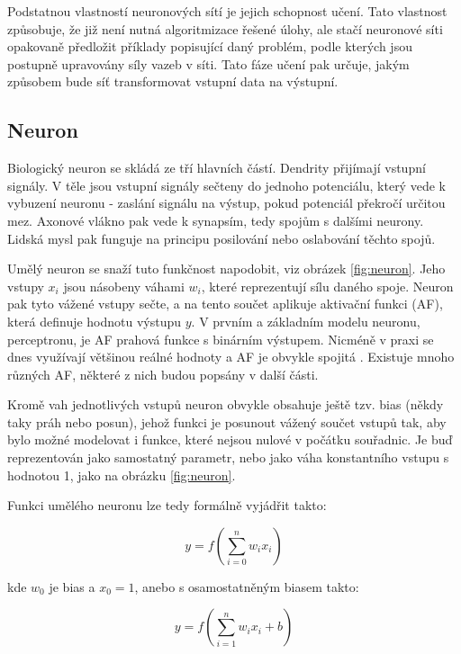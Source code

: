 Podstatnou vlastností neuronových sítí je jejich schopnost učení. Tato
vlastnost způsobuje, že již není nutná algoritmizace řešené úlohy, ale stačí
neuronové síti opakovaně předložit příklady popisující daný problém, podle
kterých jsou postupně upravovány síly vazeb v síti. Tato fáze učení pak určuje,
jakým způsobem bude síť transformovat vstupní data na
výstupní.\cite{Vondrak1994}

\subsection{Neuron}
Biologický neuron se skládá ze tří hlavních částí. Dendrity přijímají vstupní
signály. V těle jsou vstupní signály sečteny do jednoho potenciálu, který vede
k vybuzení neuronu - zaslání signálu na výstup, pokud potenciál překročí
určitou mez. Axonové vlákno pak vede k synapsím, tedy spojům s dalšími neurony.
Lidská mysl pak funguje na principu posilování nebo oslabování těchto spojů.

Umělý neuron se snaží tuto funkčnost napodobit, viz obrázek \ref{fig:neuron}.
Jeho vstupy $x_i$ jsou násobeny váhami $w_i$, které reprezentují sílu daného
spoje. Neuron pak tyto vážené vstupy sečte, a na tento součet aplikuje
aktivační funkci (AF), která definuje hodnotu výstupu $y$. V prvním a základním
modelu neuronu, perceptronu, je AF prahová funkce s binárním výstupem. Nicméně
v praxi se dnes využívají většinou reálné hodnoty a AF je obvykle spojitá
\cite{Vondrak1994}. Existuje mnoho různých AF, některé z nich budou popsány v
další části.

Kromě vah jednotlivých vstupů neuron obvykle obsahuje ještě tzv. bias (někdy
taky práh nebo posun), jehož funkci je posunout vážený součet vstupů tak, aby
bylo možné modelovat i funkce, které nejsou nulové v počátku souřadnic. Je buď
reprezentován jako samostatný parametr, nebo jako váha konstantního vstupu s
hodnotou 1, jako na obrázku \ref{fig:neuron}.

Funkci umělého neuronu lze tedy formálně vyjádřit takto:

\begin{equation*}
    y=f\left(\sum_{i=0}^{n}w_{i}x_{i}\right)
\end{equation*}

kde $w_0$ je bias a $x_0=1$, anebo s osamostatněným biasem takto:

\begin{equation*}
    y = f\left(\sum_{i=1}^{n} w_i x_i + b\right)
\end{equation*}

